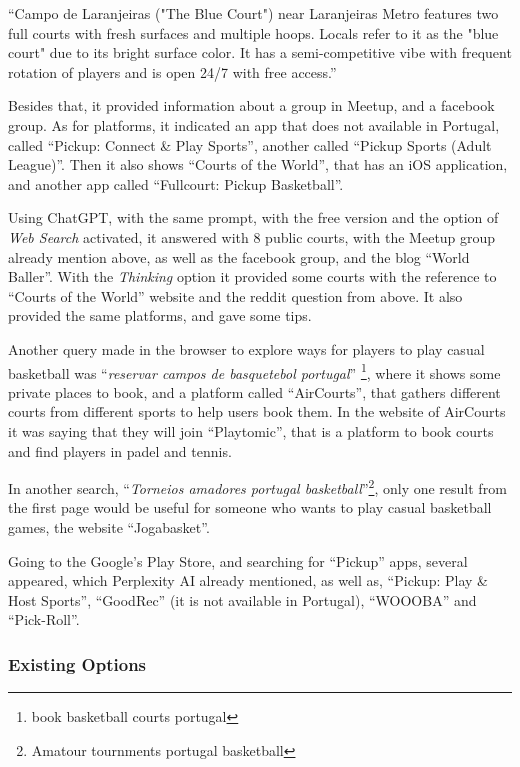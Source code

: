 ``Campo de Laranjeiras ("The Blue Court") near Laranjeiras Metro features two full courts with fresh surfaces and multiple hoops.
Locals refer to it as the "blue court" due to its bright surface color.
It has a semi-competitive vibe with frequent rotation of players and is open 24/7 with free access.''

Besides that, it provided information about a group in Meetup, and a facebook group.
As for platforms, it indicated an app that does not available in Portugal, called ``Pickup: Connect \& Play Sports'', another called ``Pickup Sports (Adult League)''\cite{pickup-adult}.
Then it also shows ``Courts of the World'', that has an iOS application, and another app called ``Fullcourt: Pickup Basketball''\cite{fullcourt-pp}.

Using ChatGPT, with the same prompt, with the free version and the option of \textit{Web Search} activated, it answered with 8 public courts, with the Meetup group already mention above, as well as the facebook group, and the blog ``World Baller''\cite{chatgpt1}.
With the \textit{Thinking} option it provided some courts with the reference to ``Courts of the World'' website and the reddit question from above.
It also provided the same platforms, and gave some tips\cite{chatgpt2}.

Another query made in the browser to explore ways for players to play casual basketball was ``\textit{reservar campos de basquetebol portugal}'' \footnote{book basketball courts portugal}, where it shows some private places to book, and a platform called ``AirCourts''\cite{aircourts}, that gathers different courts from different sports to help users book them.
In the website of AirCourts it was saying that they will join ``Playtomic''\cite{playtonic}, that is a platform to book courts and find players in padel and tennis.

In another search, ``\textit{Torneios amadores portugal basketball}''\footnote{Amatour tournments portugal basketball}, only one result from the first page would be useful for someone who wants to play casual basketball games, the website ``Jogabasket''\cite{jogabasket}.

Going to the Google's Play Store, and searching for ``Pickup'' apps, several appeared, which Perplexity AI already mentioned, as well as, ``Pickup: Play \& Host Sports''\cite{pickup, pickup-app}, ``GoodRec''\cite{goodrec} (it is not available in Portugal), ``WOOOBA''\cite{woooba} and ``Pick-Roll''\cite{pick-roll}.


\subsubsection{Existing Options}

